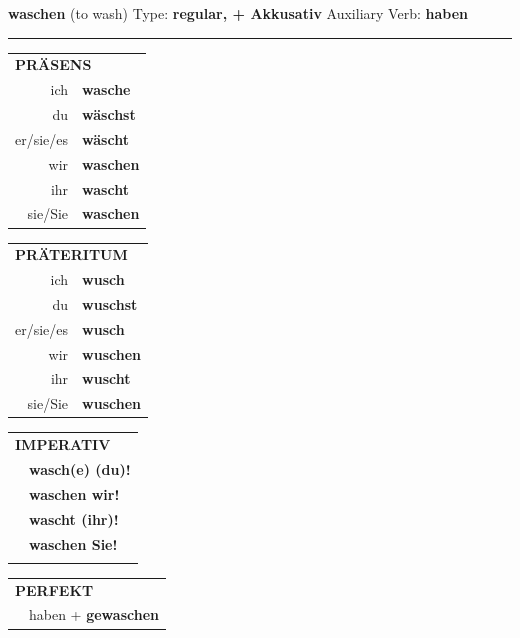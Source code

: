 \documentclass[10pt,a4paper]{revtex4-2}
\begin{document}
\begin{verbbox-acc}
    {\Large \bf waschen} (to wash) \hfill Type: \textbf{regular, + Akkusativ} \hfill Auxiliary Verb: \textbf{haben} 
    
     \vspace{5pt}

    \hrule
    
    \vspace{5pt}

  \begin{tabular}{rl}
     \multicolumn{2}{l}{\textbf{PRÄSENS} }\\
    ich & \textbf{wasche}\\
    du & \textbf{wäschst}\\
    er/sie/es & \textbf{wäscht}\\
    wir & \textbf{waschen}\\
    ihr & \textbf{wascht}\\
    sie/Sie & \textbf{waschen}\\
  \end{tabular}
  \hfill
     \begin{tabular}{rl}
    \multicolumn{2}{l}{\textbf{PRÄTERITUM} }\\
    ich & \textbf{wusch}\\
    du & \textbf{wuschst}\\
    er/sie/es & \textbf{wusch}\\
    wir & \textbf{wuschen}\\
    ihr & \textbf{wuscht}\\
    sie/Sie & \textbf{wuschen}\\
  \end{tabular}
  \hfill
  \begin{tabular}{rl}
     \multicolumn{2}{l}{\textbf{IMPERATIV} }\\
   & \textbf{wasch(e) (du)!}\\
   & \textbf{waschen wir!}\\
   & \textbf{wascht (ihr)!}\\
   & \textbf{waschen Sie!}\\
   & \vspace{10pt}
  \end{tabular}

    \vspace{10pt}

 \begin{tabular}{rl}
     \multicolumn{2}{l}{\textbf{PERFEKT}}\\
  &  haben + \textbf{gewaschen}\\
  \end{tabular}
\hfill
   \begin{tabular}{rl}
   

\end{tabular}
\end{verbbox-acc}
\end{document}
